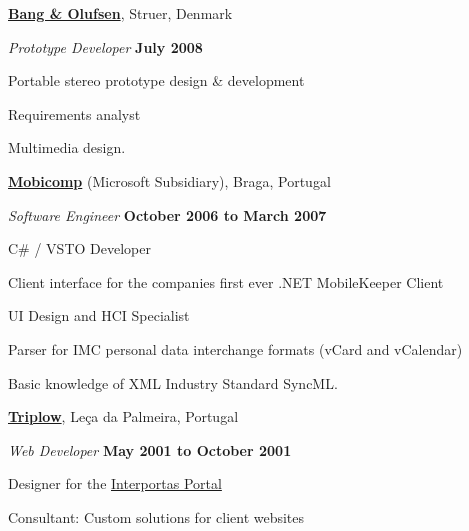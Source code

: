 \documentclass[10pt]{article}
\newenvironment{outerlist}[1][\enskip\textbullet]%
        {\begin{enumerate}[#1]}{\end{enumerate}%
         \vspace{-.6\baselineskip}}
\newenvironment{innerlist}[1][\enskip\textbullet]%
        {\begin{compactenum}[#1]}{\end{compactenum}}
\newcommand{\blankline}{\quad\pagebreak[2]}
\begin{document}
\blankline

\href{http://www.bang-olufsen.com}{\textbf{Bang \& Olufsen}}, 
Struer, Denmark
\begin{outerlist}

\item[] \textit{Prototype Developer}%
        \hfill \textbf{July 2008}
\begin{innerlist}
\item Portable stereo prototype design \& development 
\item Requirements analyst
\item Multimedia design.

\end{innerlist}

\end{outerlist}

\blankline

\href{http://www.mobicomp.com/}{\textbf{Mobicomp}} (Microsoft Subsidiary), 
Braga, Portugal
\begin{outerlist}

\item[] \textit{Software Engineer}%
        \hfill \textbf{October 2006 to March 2007}
\begin{innerlist}
\item C\# / VSTO Developer
\item Client interface for the companies first ever .NET MobileKeeper Client
\item UI Design and HCI Specialist
\item Parser for IMC personal data interchange formats (vCard and vCalendar)
\item Basic knowledge of XML Industry Standard SyncML.
\end{innerlist}

\end{outerlist}

\blankline

\textbf{\href{http://www.triplow.pt}{Triplow}}, 
Le\c ca da Palmeira, Portugal
\begin{outerlist}

\item[] \textit{Web Developer}%
        \hfill \textbf{May 2001 to October 2001}
\begin{innerlist}
  \item Designer for the \href{https://www.interportas.net}{Interportas Portal}
  \item Consultant: Custom solutions for client websites
\end{innerlist}

\end{outerlist}
\end{document}
